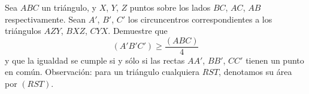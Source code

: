 Sea $ABC$ un triángulo, y $X$, $Y$, $Z$ puntos sobre los lados $BC$, $AC$, $AB$ respectivamente. Sean $A'$, $B'$, $C'$ los circuncentros correspondientes a los triángulos $AZY$, $BXZ$, $CYX$. Demuestre que 
\[(A'B'C') \geq \frac{(ABC)}{4}\]
y que la igualdad se cumple si y sólo si las rectas $AA'$, $BB'$, $CC'$ tienen un punto en común. \newline 
Observación: para un triángulo cualquiera $RST$, denotamos su área por $(RST)$.
